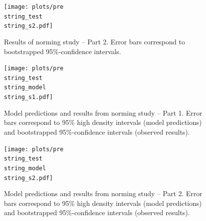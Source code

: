 \documentclass[lucida,biblatex]{sp} %
\begin{document}
\begin{figure}
\texttt{[image: plots/pre\\string\_test\\string\_s2.pdf]}
\caption{Results of norming study -- Part 2. Error bars correspond to bootstrapped 95\%-confidence intervals. \label{fig:norming-results-2}}

\end{figure}

\begin{figure}
\texttt{[image: plots/pre\\string\_test\\string\_model\\string\_s1.pdf]}
\caption{Model predictions and results from norming study -- Part 1. Error bars correspond to 95\% high density intervals (model predictions) and bootstrapped 95\%-confidence intervals (observed results). \label{fig:norming-results-model-1}}

\end{figure}

\begin{figure}
\texttt{[image: plots/pre\\string\_test\\string\_model\\string\_s2.pdf]}
\caption{Model predictions and results from norming study -- Part 2. Error bars correspond to 95\% high density intervals (model predictions) and bootstrapped 95\%-confidence intervals (observed results). \label{fig:norming-results-model-2}}

\end{figure}
\end{document}
